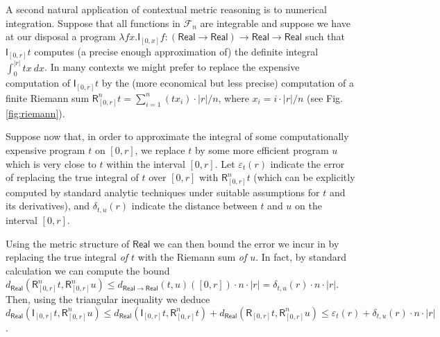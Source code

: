 \begin{example}
A second natural application of contextual metric reasoning is to numerical integration. Suppose that all functions in $\mathcal F_{n}$ are integrable and suppose we have at our disposal a program $\lambda fx.\mathsf I_{[0,x]}f: (\mathsf{Real}\to \mathsf{Real})\to \mathsf{Real}\to \mathsf{Real}$ such that $\mathsf I_{[0,r]}t$ computes (a precise enough approximation of) the definite integral $\int_{0}^{|r|}tx \ dx$.
In many contexts we might prefer to replace the expensive computation of $\mathsf I_{[0,r]}t$ by the (more economical but less precise) computation of a finite Riemann sum $\mathsf R^{n}_{[0,r]}t=  \sum_{i=1}^{n}(tx_{i})\cdot |r|/n$, where 
 $x_{i}=  i\cdot |r|/n$ (see Fig. \ref{fig:riemann}).  

%
%


Suppose now that, in order to approximate the integral of some computationally expensive program $t$ on $[0,r]$, we replace $t$ by some more efficient program $u$ which is very close to $t$ within the interval $[0,r]$.
Let $\varepsilon_{t}(r)$ indicate the error of replacing the true integral of $t$ over $[0,r]$ with $\mathsf{R}^{n}_{[0,r]}t$ (which can be explicitly computed by standard analytic techniques under suitable assumptions for $t$ and its derivatives),
 and 
$\delta_{t,u}(r)$ indicate the distance between $t$ and $u$ on the interval $[0,r]$.

Using the metric structure of $\mathsf{Real}$ we can then bound the error we incur in by replacing the true integral \emph{of $t$} with the Riemann sum \emph{of $u$}. 
In fact, by standard calculation we can compute the bound
$d_{\mathsf{Real}} ( \mathsf{R}^{n}_{[0,r]}t, \mathsf R^{n}_{[0,r]}u)\leq 
d_{\mathsf{Real}\to\mathsf{Real}}(t, u)([0,r]) \cdot n \cdot |r|= \delta_{t,u}(r)\cdot n \cdot |r|$.
Then, using the triangular inequality we deduce
$d_{\mathsf{Real}} ( \mathsf{I}_{[0,r]}t, \mathsf R^{n}_{[0,r]}u)
\leq
d_{\mathsf{Real}} ( \mathsf{I}_{[0,r]}t, \mathsf R^{n}_{[0,r]}t) +
d_{\mathsf{Real}} ( \mathsf{R}_{[0,r]}t,\mathsf R^{n}_{[0,r]}u) \leq 
\varepsilon_{t}(r)
+ 
\delta_{t,u}(r)\cdot 
 n\cdot |r|$.
 

\end{example}
